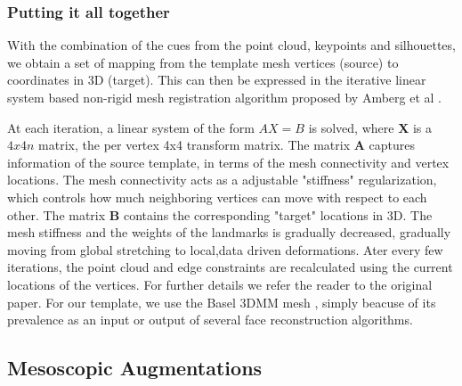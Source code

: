 \documentclass[10pt,twocolumn,letterpaper]{article}
\begin{document}
 \subsubsection{Putting it all together}
 With the combination of the cues from the point cloud, keypoints and silhouettes, we obtain a set of mapping from the template mesh vertices (source) to coordinates in 3D (target). This can then be expressed in the iterative linear system based non-rigid mesh registration algorithm proposed by Amberg et al \cite{amberg2007optimal}. 
 
 At each iteration, a linear system of the form $AX=B$ is solved, where \textbf{X} is a $4x4n$ matrix, the per vertex 4x4 transform matrix. The matrix \textbf{A} captures information of the source template, in terms of the mesh connectivity and vertex locations. The mesh connectivity acts as a adjustable "stiffness" regularization, which controls how much neighboring vertices can move with respect to each other. The matrix 
 \textbf{B} contains the corresponding "target" locations in 3D. The mesh stiffness and the weights of the landmarks is gradually decreased, gradually moving from global stretching to local,data driven deformations. Ater every few iterations, the point cloud and edge constraints are recalculated using the current locations of the vertices. For further details we refer the reader to the original paper. For our template, we use the Basel 3DMM mesh \cite{blanz1999morphable}, simply beacuse of its prevalence as an input or output of several face reconstruction algorithms.





\subsection{Mesoscopic Augmentations}
\end{document}

